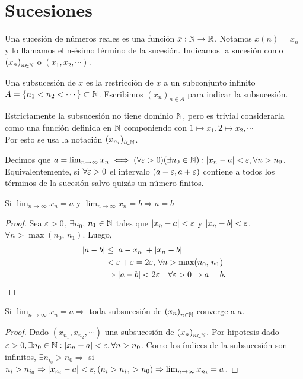 \section{Sucesiones}

Una sucesión de números reales es una función \(x: \mathbb{N} \to \mathbb{R} \). Notamos \(x(n) = x_n\) y lo llamamos el n-ésimo término de la sucesión. Indicamos la sucesión como \({(x_n)}_{n \in \mathbb{N}} \) o \((x_1, x_2, \cdots)\).

Una subsucesión de \(x\) es la restricción de \(x\) a un subconjunto infinito \(A = \{ n_1 < n_2 < \cdots \} \subset \mathbb{N} \). Escribimos \({(x_n)}_{n \in A} \) para indicar la subsucesión.

\begin{note}
  Estrictamente la subsucesión no tiene dominio \(\mathbb{N} \), pero es trivial considerarla como una función definida en \(\mathbb{N} \) componiendo con \(1 \mapsto x_1, 2 \mapsto x_2, \cdots \) \\
  Por esto se usa la notación \({(x_{n_i})}_{i \in \mathbb{N}} \).
\end{note}

\begin{definition}
  Decimos que \(a = \lim_{n \to \infty} x_n \iff (\forall \varepsilon > 0)(\exists n_0 \in \mathbb{N}) : |x_n - a| < \varepsilon, \forall n > n_0\). \\
  Equivalentemente, si \(\forall \varepsilon > 0\) el intervalo \((a-\varepsilon, a+\varepsilon)\) contiene a todos los términos de la sucesión salvo quizás un número finitos.
\end{definition}

\begin{theorem}
  Si \(\lim_{n \to \infty} x_n = a\) y \(\lim_{n \to \infty} x_n = b \Rightarrow a=b\)
  \begin{proof}
    Sea \(\varepsilon > 0\), \(\exists n_0\), \(n_1 \in \mathbb{N} \) tales que \(|x_n - a| < \varepsilon \) y \(|x_n - b| < \varepsilon \), \(\forall n > \max(n_0\text{, } n_1)\). Luego, \begin{align*}
      |a - b| & \leq |a - x_n| + |x_n - b|                                        \\
              & < \varepsilon + \varepsilon = 2\varepsilon\text{, } \forall n > \max(n_0\text{, } n_1)       \\
              & \Rightarrow |a - b| < 2\varepsilon \quad \forall \varepsilon > 0 \Rightarrow a = b.
    \end{align*}
  \end{proof}
\end{theorem}

\begin{theorem}
  Si \(\lim_{n \to \infty} x_n = a \Rightarrow \) toda subsucesión de \({(x_n)}_{n \in \mathbb{N}} \) converge a \(a\).
  \begin{proof}
    Dado \((x_{n_1}, x_{n_2}, \cdots)\) una subsucesión de \({(x_n)}_{n \in \mathbb{N}} \). Por hipotesis dado \(\varepsilon > 0, \exists n_0 \in \mathbb{N} : |x_n - a| < \varepsilon, \forall n > n_0\). Como los índices de la subsucesión son infinitos, \(\exists n_{i_0} > n_0 \Rightarrow \) si \(n_i > n_{i_0} \Rightarrow |x_{n_i} - a| < \varepsilon, (n_i > n_{i_0} > n_0) \Rightarrow \lim_{n \to \infty} x_{n_i} = a\).
  \end{proof}
\end{theorem}

